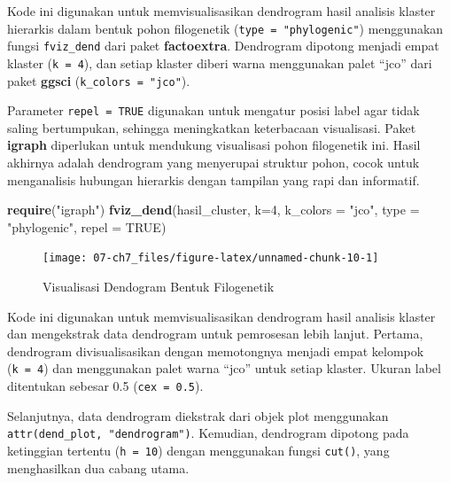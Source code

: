 \documentclass[
  oneside]{book}
\newenvironment{Shaded}{\begin{snugshade}}{\end{snugshade}}
\newcommand{\AttributeTok}[1]{\textcolor[rgb]{0.13,0.29,0.53}{#1}}
\newcommand{\ConstantTok}[1]{\textcolor[rgb]{0.56,0.35,0.01}{#1}}
\newcommand{\DecValTok}[1]{\textcolor[rgb]{0.00,0.00,0.81}{#1}}
\newcommand{\FunctionTok}[1]{\textcolor[rgb]{0.13,0.29,0.53}{\textbf{#1}}}
\newcommand{\NormalTok}[1]{#1}
\newcommand{\StringTok}[1]{\textcolor[rgb]{0.31,0.60,0.02}{#1}}
\begin{document}
Kode ini digunakan untuk memvisualisasikan dendrogram hasil analisis klaster hierarkis dalam bentuk pohon filogenetik (\texttt{type\ =\ "phylogenic"}) menggunakan fungsi \texttt{fviz\_dend} dari paket \textbf{factoextra}. Dendrogram dipotong menjadi empat klaster (\texttt{k\ =\ 4}), dan setiap klaster diberi warna menggunakan palet ``jco'' dari paket \textbf{ggsci} (\texttt{k\_colors\ =\ "jco"}).

Parameter \texttt{repel\ =\ TRUE} digunakan untuk mengatur posisi label agar tidak saling bertumpukan, sehingga meningkatkan keterbacaan visualisasi. Paket \textbf{igraph} diperlukan untuk mendukung visualisasi pohon filogenetik ini. Hasil akhirnya adalah dendrogram yang menyerupai struktur pohon, cocok untuk menganalisis hubungan hierarkis dengan tampilan yang rapi dan informatif.

\begin{Shaded}
\begin{Highlighting}[]
\FunctionTok{require}\NormalTok{(}\StringTok{"igraph"}\NormalTok{)}
\FunctionTok{fviz\_dend}\NormalTok{(hasil\_cluster, }\AttributeTok{k=}\DecValTok{4}\NormalTok{, }\AttributeTok{k\_colors =} \StringTok{"jco"}\NormalTok{,}
\AttributeTok{type =} \StringTok{"phylogenic"}\NormalTok{, }\AttributeTok{repel =} \ConstantTok{TRUE}\NormalTok{)}
\end{Highlighting}
\end{Shaded}

\begin{figure}[h]

{\centering \texttt{[image: 07-ch7\_files/figure-latex/unnamed-chunk-10-1]} 

}

\caption{Visualisasi Dendogram Bentuk Filogenetik}\label{fig:unnamed-chunk-10}
\end{figure}

Kode ini digunakan untuk memvisualisasikan dendrogram hasil analisis klaster dan mengekstrak data dendrogram untuk pemrosesan lebih lanjut. Pertama, dendrogram divisualisasikan dengan memotongnya menjadi empat kelompok (\texttt{k\ =\ 4}) dan menggunakan palet warna ``jco'' untuk setiap klaster. Ukuran label ditentukan sebesar 0.5 (\texttt{cex\ =\ 0.5}).

Selanjutnya, data dendrogram diekstrak dari objek plot menggunakan \texttt{attr(dend\_plot,\ "dendrogram")}. Kemudian, dendrogram dipotong pada ketinggian tertentu (\texttt{h\ =\ 10}) dengan menggunakan fungsi \texttt{cut()}, yang menghasilkan dua cabang utama.
\end{document}
